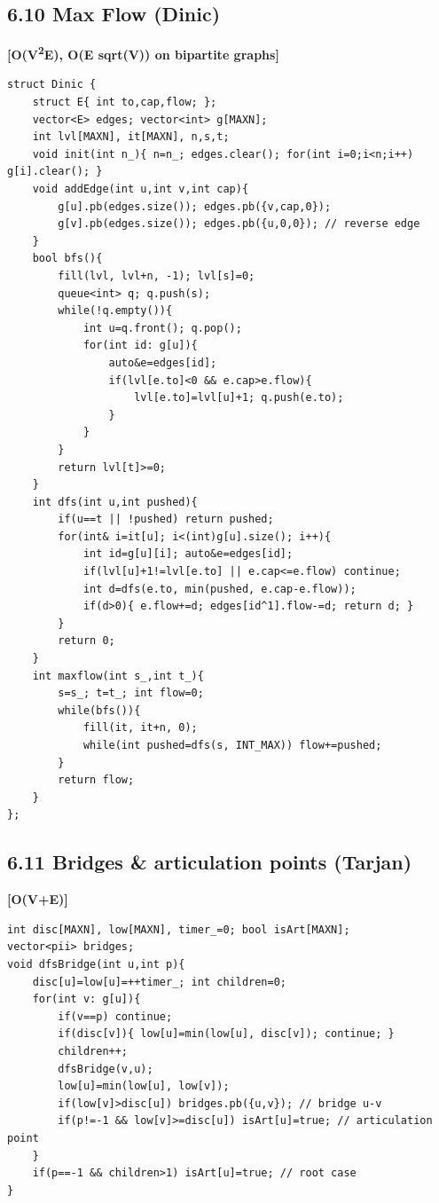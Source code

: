 \documentclass[11pt]{extarticle}
\newcommand{\comp}[1]{\textbf{[#1]}\\}
\begin{document}
\subsection*{6.10 Max Flow (Dinic)}
\comp{O(V\textsuperscript{2}E), O(E sqrt(V)) on bipartite graphs}
\begin{lstlisting}
struct Dinic {
    struct E{ int to,cap,flow; };
    vector<E> edges; vector<int> g[MAXN];
    int lvl[MAXN], it[MAXN], n,s,t;
    void init(int n_){ n=n_; edges.clear(); for(int i=0;i<n;i++) g[i].clear(); }
    void addEdge(int u,int v,int cap){
        g[u].pb(edges.size()); edges.pb({v,cap,0});
        g[v].pb(edges.size()); edges.pb({u,0,0}); // reverse edge
    }
    bool bfs(){
        fill(lvl, lvl+n, -1); lvl[s]=0;
        queue<int> q; q.push(s);
        while(!q.empty()){
            int u=q.front(); q.pop();
            for(int id: g[u]){
                auto&e=edges[id];
                if(lvl[e.to]<0 && e.cap>e.flow){
                    lvl[e.to]=lvl[u]+1; q.push(e.to);
                }
            }
        }
        return lvl[t]>=0;
    }
    int dfs(int u,int pushed){
        if(u==t || !pushed) return pushed;
        for(int& i=it[u]; i<(int)g[u].size(); i++){
            int id=g[u][i]; auto&e=edges[id];
            if(lvl[u]+1!=lvl[e.to] || e.cap<=e.flow) continue;
            int d=dfs(e.to, min(pushed, e.cap-e.flow));
            if(d>0){ e.flow+=d; edges[id^1].flow-=d; return d; }
        }
        return 0;
    }
    int maxflow(int s_,int t_){
        s=s_; t=t_; int flow=0;
        while(bfs()){
            fill(it, it+n, 0);
            while(int pushed=dfs(s, INT_MAX)) flow+=pushed;
        }
        return flow;
    }
};
\end{lstlisting}

\subsection*{6.11 Bridges \& articulation points (Tarjan)}
\comp{O(V+E)}
\begin{lstlisting}
int disc[MAXN], low[MAXN], timer_=0; bool isArt[MAXN];
vector<pii> bridges;
void dfsBridge(int u,int p){
    disc[u]=low[u]=++timer_; int children=0;
    for(int v: g[u]){
        if(v==p) continue;
        if(disc[v]){ low[u]=min(low[u], disc[v]); continue; }
        children++;
        dfsBridge(v,u);
        low[u]=min(low[u], low[v]);
        if(low[v]>disc[u]) bridges.pb({u,v}); // bridge u-v
        if(p!=-1 && low[v]>=disc[u]) isArt[u]=true; // articulation point
    }
    if(p==-1 && children>1) isArt[u]=true; // root case
}
\end{lstlisting}
\end{document}
